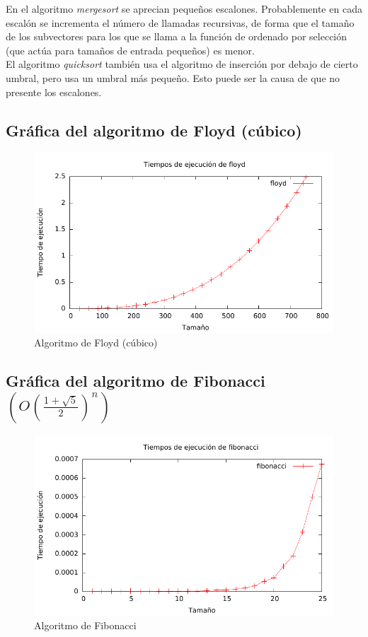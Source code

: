 \documentclass[a4paper, 11pt]{article}
\begin{document}
En el algoritmo \textit{mergesort} se aprecian pequeños escalones. Probablemente en cada escalón se incrementa el número de llamadas recursivas, de forma que el tamaño de los subvectores para los que se llama a la función de ordenado por selección (que actúa para tamaños de entrada pequeños) es menor. \\

El algoritmo \textit{quicksort} también usa el algoritmo de inserción por debajo de cierto umbral, pero usa un umbral más pequeño. Esto puede ser la causa de que no presente los escalones.

\newpage
\subsection{Gráfica del algoritmo de Floyd (cúbico)}
\begin{figure}[h] \includegraphics[width=13cm]{floyd_g} \centering
	\caption{Algoritmo de Floyd (cúbico)} \end{figure}

\subsection{Gráfica del algoritmo de Fibonacci $(O(\frac{1+\sqrt{5}}{2})^n)$}
\begin{figure}[h] \includegraphics[width=13cm]{fibonacci_g} \centering
	\caption{Algoritmo de Fibonacci} \end{figure}
\end{document}
